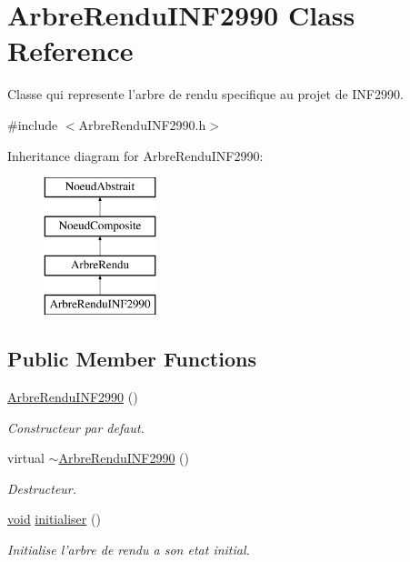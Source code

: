 \hypertarget{class_arbre_rendu_i_n_f2990}{\section{Arbre\-Rendu\-I\-N\-F2990 Class Reference}
\label{class_arbre_rendu_i_n_f2990}
}


Classe qui represente l'arbre de rendu specifique au projet de I\-N\-F2990.  




{\ttfamily \#include $<$Arbre\-Rendu\-I\-N\-F2990.\-h$>$}

Inheritance diagram for Arbre\-Rendu\-I\-N\-F2990\-:\begin{figure}[H]
\begin{center}
\leavevmode
\includegraphics[height=4.000000cm]{class_arbre_rendu_i_n_f2990}
\end{center}
\end{figure}
\subsection*{Public Member Functions}
\begin{DoxyCompactItemize}
\item 
\hyperlink{group__inf2990_ga67528b7fa54e8ef8f96ef2e0bad06d2d}{Arbre\-Rendu\-I\-N\-F2990} ()
\begin{DoxyCompactList}\small\item\em Constructeur par defaut. \end{DoxyCompactList}\item 
virtual \hyperlink{group__inf2990_gaa67526b2fd719f6bcef7a4547bd25c7b}{$\sim$\-Arbre\-Rendu\-I\-N\-F2990} ()
\begin{DoxyCompactList}\small\item\em Destructeur. \end{DoxyCompactList}\item 
\hyperlink{wglew_8h_aeea6e3dfae3acf232096f57d2d57f084}{void} \hyperlink{group__inf2990_ga678d89e1f12ae16ee7dcf6de3db637a3}{initialiser} ()
\begin{DoxyCompactList}\small\item\em Initialise l'arbre de rendu a son etat initial. \end{DoxyCompactList}\end{DoxyCompactItemize}
